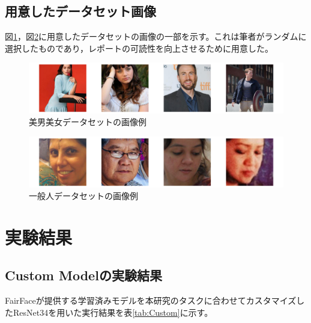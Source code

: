 \documentclass[a4paper,11pt,titlepage]{jsarticle}
\begin{document}
\subsection{用意したデータセット画像}
図\ref{fig:good_ex}，図\ref{fig:normal_ex}に用意したデータセットの画像の一部を示す。これは筆者がランダムに選択したものであり，レポートの可読性を向上させるために用意した。
\begin{figure}[htbp]
    \centering
    \includegraphics[width=1.1\textwidth]{ex_good_dataset.png}
    \caption{美男美女データセットの画像例}
    \label{fig:good_ex}
\end{figure}
\begin{figure}[H]
    \centering
    \includegraphics[width=1.1\textwidth]{ex_normal_dataset.png}
    \caption{一般人データセットの画像例}
    \label{fig:normal_ex}
\end{figure}


\section{実験結果}
\label{label:実験結果}
\subsection{Custom Modelの実験結果}
FairFaceが提供する学習済みモデルを本研究のタスクに合わせてカスタマイズしたResNet34を用いた実行結果を表\ref{tab:Custom}に示す。
\end{document}
